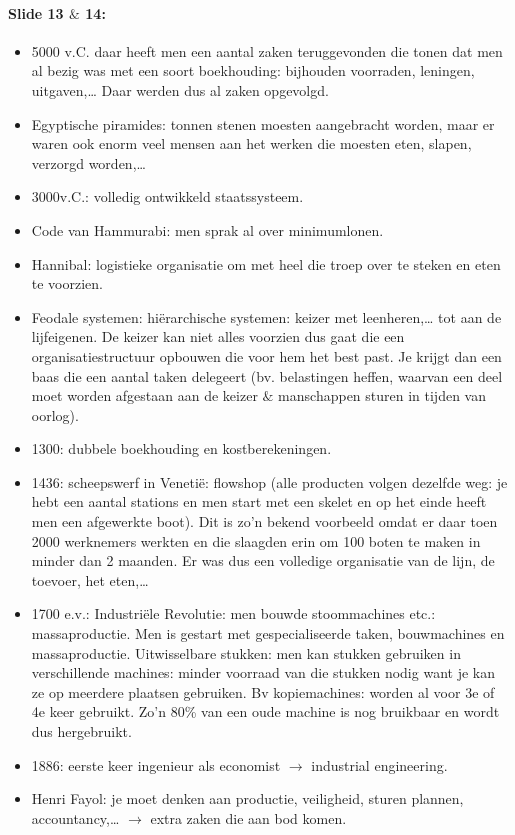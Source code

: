 \documentclass[10pt,a4paper]{report}
\begin{document}
\paragraph{Slide 13 $\&$ 14:}
\begin{itemize}
\item 5000 v.C. daar heeft men een aantal zaken teruggevonden die tonen dat men al bezig was met een soort boekhouding: bijhouden voorraden, leningen, uitgaven,… Daar werden dus al zaken opgevolgd.
\item Egyptische piramides: tonnen stenen moesten aangebracht worden, maar er waren ook enorm veel mensen aan het werken die moesten eten, slapen, verzorgd worden,…
\item 3000v.C.: volledig ontwikkeld staatssysteem.
\item Code van Hammurabi: men sprak al over minimumlonen.
\item Hannibal: logistieke organisatie om met heel die troep over te steken en eten te voorzien.
\item Feodale systemen: hi\"erarchische systemen: keizer met leenheren,… tot aan de lijfeigenen. De keizer kan niet alles voorzien dus gaat die een organisatiestructuur opbouwen die voor hem het best past. Je krijgt dan een baas die een aantal taken delegeert (bv. belastingen heffen, waarvan een deel moet worden afgestaan aan de keizer $\&$ manschappen sturen in tijden van oorlog).
\item 1300: dubbele boekhouding en kostberekeningen.
\item 1436: scheepswerf in Venetië: flowshop (alle producten volgen dezelfde weg: je hebt een aantal stations en men start met een skelet en op het einde heeft men een afgewerkte boot). Dit is zo'n bekend voorbeeld omdat er daar toen 2000 werknemers werkten en die slaagden erin om 100 boten te maken in minder dan 2 maanden. Er was dus een volledige organisatie van de lijn, de toevoer, het eten,…
\item 1700 e.v.: Industri\"ele Revolutie: men bouwde stoommachines etc.: massaproductie. Men is gestart met gespecialiseerde taken, bouwmachines en massaproductie. Uitwisselbare stukken: men kan stukken gebruiken in verschillende machines: minder voorraad van die stukken nodig want je kan ze op meerdere plaatsen gebruiken. Bv kopiemachines: worden al voor 3e of 4e keer gebruikt. Zo'n 80\% van een oude machine is nog bruikbaar en wordt dus hergebruikt.
\item 1886: eerste keer ingenieur als economist $\rightarrow$ industrial engineering.
\item Henri Fayol: je moet denken aan productie, veiligheid, sturen plannen, accountancy,… $\rightarrow$ extra zaken die aan bod komen.
	\end{itemize}
	
\end{document}
